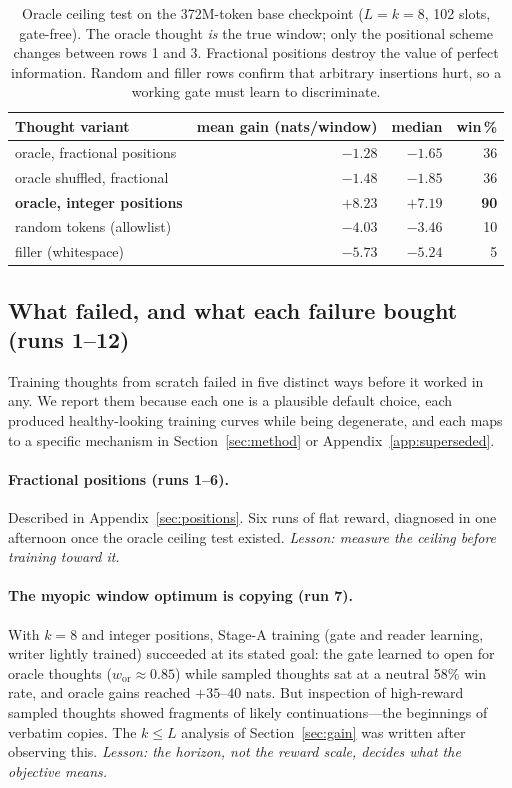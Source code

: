 \documentclass{article} %
\begin{document}
\begin{table}[t]
\centering
\begin{tabular}{lrrr}
\toprule
Thought variant & mean gain (nats/window) & median & win\,\% \\
\midrule
oracle, fractional positions        & $-1.28$ & $-1.65$ & 36 \\
oracle shuffled, fractional         & $-1.48$ & $-1.85$ & 36 \\
\textbf{oracle, integer positions}  & $\mathbf{+8.23}$ & $\mathbf{+7.19}$ & \textbf{90} \\
random tokens (allowlist)           & $-4.03$ & $-3.46$ & 10 \\
filler (whitespace)                 & $-5.73$ & $-5.24$ & 5 \\
\bottomrule
\end{tabular}
\caption{Oracle ceiling test on the 372M-token base checkpoint ($L{=}k{=}8$, 102 slots, gate-free). The oracle thought \emph{is} the true window; only the positional scheme changes between rows 1 and 3. Fractional positions destroy the value of perfect information. Random and filler rows confirm that arbitrary insertions hurt, so a working gate must learn to discriminate.}
\label{tab:oracle}
\end{table}

\subsection{What failed, and what each failure bought (runs 1--12)}
\label{sec:failures}

Training thoughts from scratch failed in five distinct ways before it worked in any. We report them because each one is a plausible default choice, each produced healthy-looking training curves while being degenerate, and each maps to a specific mechanism in Section~\ref{sec:method} or Appendix~\ref{app:superseded}.

\paragraph{Fractional positions (runs 1--6).} Described in Appendix~\ref{sec:positions}. Six runs of flat reward, diagnosed in one afternoon once the oracle ceiling test existed. \emph{Lesson: measure the ceiling before training toward it.}

\paragraph{The myopic window optimum is copying (run 7).} With $k = 8$ and integer positions, Stage-A training (gate and reader learning, writer lightly trained) succeeded at its stated goal: the gate learned to open for oracle thoughts ($w_{\mathrm{or}} \approx 0.85$) while sampled thoughts sat at a neutral 58\% win rate, and oracle gains reached $+35$--$40$ nats. But inspection of high-reward sampled thoughts showed fragments of likely continuations---the beginnings of verbatim copies. The $k \le L$ analysis of Section~\ref{sec:gain} was written after observing this. \emph{Lesson: the horizon, not the reward scale, decides what the objective means.}
\end{document}
